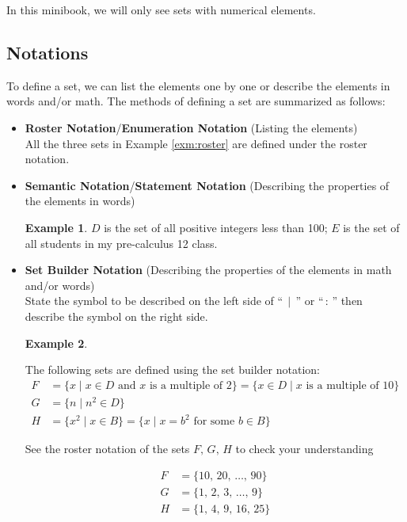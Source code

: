 \documentclass[
]{book}
\theoremstyle{definition}
\theoremstyle{definition}
\newtheorem{example}{Example}[chapter]
\theoremstyle{definition}
\theoremstyle{definition}
\theoremstyle{remark}
\begin{document}
In this minibook, we will only see sets with numerical elements.

\hypertarget{notations}{%
\subsection{Notations}\label{notations}}

To define a set, we can list the elements one by one or describe the elements in words and/or math. The methods of defining a set are summarized as follows:

\begin{itemize}
\item
  \textbf{Roster Notation}/\textbf{Enumeration Notation} (Listing the elements)\\
  All the three sets in Example \ref{exm:roster} are defined under the roster notation.
\item
  \textbf{Semantic Notation}/\textbf{Statement Notation} (Describing the properties of the elements in words)

  \begin{example}
  \protect\hypertarget{exm:semantic}{}\label{exm:semantic}\(D\) is the set of all positive integers less than 100; \(E\) is the set of all students in my pre-calculus 12 class.
  \end{example}
\item
  \textbf{Set Builder Notation} (Describing the properties of the elements in math and/or words)\\
  State the symbol to be described on the left side of ``\(\,\mid\,\)'' or ``\(\,:\,\)'' then describe the symbol on the right side.

  \begin{example}
  \protect\hypertarget{exm:set-builder}{}\label{exm:set-builder}

  The following sets are defined using the set builder notation:
  \begin{align*}
  F &= \{x \mid x \in D \text{ and $x$ is a multiple of } 2\} = \{x \in D \mid x \text{ is a multiple of } 10\}\\
  G &= \{n \mid n^2 \in D\}\\
  H &= \{x^2 \mid x \in B\} = \{x \mid x = b^2 \text{ for some } b \in B\}
  \end{align*}

  See the roster notation of the sets \(F,\,G,\,H\) to check your understanding

  \begin{align*}
  F &= \{10,\, 20,\, \dots,\, 90\}\\
  G &= \{1,\, 2,\, 3,\, \dots,\, 9\}\\
  H &= \{1,\, 4,\, 9,\, 16,\, 25\}
  \end{align*}


\end{example}
\end{itemize}
\end{document}
